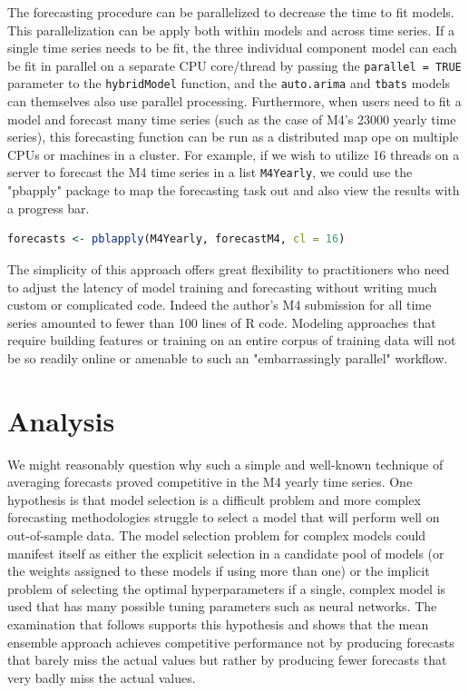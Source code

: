 \documentclass[11pt,3p,review,authoryear]{elsarticle}
\begin{document}
The forecasting procedure can be parallelized to decrease the time to fit models. This parallelization can be apply both within models and across time series. If a single time series needs to be fit, the three individual component model can each be fit in parallel on a separate CPU core/thread by passing the \texttt{parallel = TRUE} parameter to the \texttt{hybridModel} function, and the \texttt{auto.arima} and \texttt{tbats} models can themselves also use parallel processing. Furthermore, when users need to fit a model and forecast many time series (such as the case of M4's 23000 yearly time series), this forecasting function can be run as a distributed map ope on multiple CPUs or machines in a cluster. For example, if we wish to utilize 16 threads on a server to forecast the M4 time series in a list \texttt{M4Yearly}, we could use the "pbapply" package to map the forecasting task out and also view the results with a progress bar.

\begin{lstlisting}[language=R]
forecasts <- pblapply(M4Yearly, forecastM4, cl = 16)
\end{lstlisting}


The simplicity of this approach offers great flexibility to practitioners who need to adjust the latency of model training and forecasting without writing much custom or complicated code. Indeed the author's M4 submission for all time series amounted to fewer than 100 lines of R code. Modeling approaches that require building features or training on an entire corpus of training data will not be so readily online or amenable to such an "embarrassingly parallel" workflow.

\section{Analysis}
We might reasonably question why such a simple and well-known technique of averaging forecasts proved competitive in the M4 yearly time series. One hypothesis is that model selection is a difficult problem and more complex forecasting methodologies struggle to select a model that will perform well on out-of-sample data. The model selection problem for complex models could manifest itself as either the explicit selection in a candidate pool of models (or the weights assigned to these models if using more than one) or the implicit problem of selecting the optimal hyperparameters if a single, complex model is used that has many possible tuning parameters such as neural networks. The examination that follows supports this hypothesis and shows that the mean ensemble approach achieves competitive performance not by producing forecasts that barely miss the actual values but rather by producing fewer forecasts that very badly miss the actual values.
\end{document}
